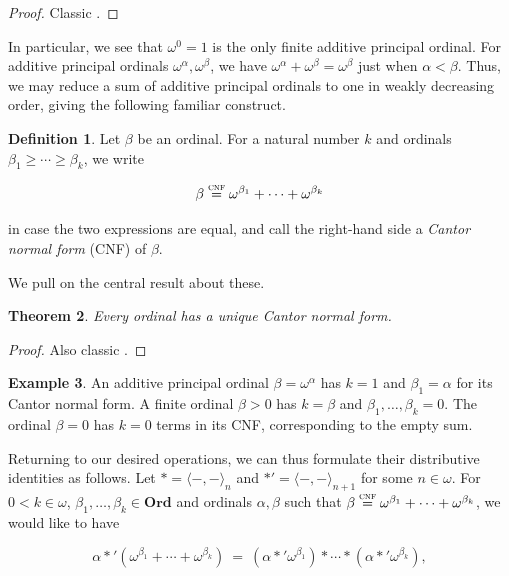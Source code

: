 \documentclass[12pt, a4paper]{article}
\newtheorem{theorem}{Theorem}[section]
\theoremstyle{definition}
\newtheorem{definition}[theorem]{Definition}
\newtheorem{example}[theorem]{Example}
\theoremstyle{remark}
\newcommand{\ord}{\mathbf{Ord}}
\newcommand{\op}[2]{\langle#1, #2\rangle}
\begin{document}
\begin{proof}
    Classic \cite{Sie1965}.
\end{proof}

In particular, we see that $\omega^0 = 1$ is the only finite additive principal ordinal. For additive principal ordinals $\omega^\alpha, \omega^\beta$, we have $\omega^\alpha + \omega^\beta = \omega^\beta$ just when $\alpha < \beta$. Thus, we may reduce a sum of additive principal ordinals to one in weakly decreasing order, giving the following familiar construct.

\begin{definition}\label{cnf}
    Let $\beta$ be an ordinal. For a natural number $k$ and ordinals $\beta_1 \geq \cdots \geq \beta_k$, we write

    \[\beta \stackrel{\textsc{cnf}}{=} \omega^{\beta_1} + \cdots + \omega^{\beta_k}\]

    in case the two expressions are equal, and call the right-hand side a \emph{Cantor normal form} (CNF) of $\beta$.
\end{definition}

We pull on the central result about these.

\begin{theorem}
    Every ordinal has a unique Cantor normal form.
\end{theorem}

\begin{proof}
    Also classic \cite{Sie1965}.
\end{proof}

\begin{example}
    An additive principal ordinal $\beta = \omega^\alpha$ has $k = 1$ and $\beta_1 = \alpha$ for its Cantor normal form. A finite ordinal $\beta > 0$ has $k = \beta$ and $\beta_1, \ldots, \beta_k = 0$. The ordinal $\beta = 0$ has $k = 0$ terms in its CNF, corresponding to the empty sum.
\end{example}

Returning to our desired operations, we can thus formulate their distributive identities as follows. Let $* = \op--_n$ and $*' = \op--_{n+1}$ for some $n\in\omega$. For $0<k\in\omega$, $\beta_1, \ldots, \beta_k \in \ord$ and ordinals $\alpha, \beta$ such that $\beta \stackrel{\textsc{cnf}}{=} \omega^{\beta_1} + \cdots + \omega^{\beta_k}$, we would like to have

\[\alpha *' (\omega^{\beta_1} + \cdots + \omega^{\beta_k})\ =\ (\alpha *' \omega^{\beta_1}) * \cdots * (\alpha *' \omega^{\beta_k}),\]
\end{document}
